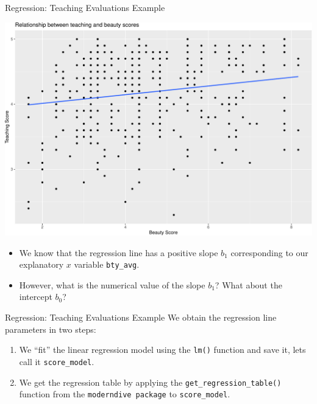 \documentclass[
  ignorenonframetext,
]{beamer}
\begin{document}
\begin{frame}[fragile]{Regression: Teaching Evaluations Example}
\protect\hypertarget{regression-teaching-evaluations-example}{}
\tiny

\begin{center}\includegraphics[width=0.5\linewidth,height=0.5\textheight]{Week4_files/figure-beamer/unnamed-chunk-19-1} \end{center}
\normalsize

\begin{itemize}
\item
  We know that the regression line has a positive slope \(b_1\)
  corresponding to our explanatory \(x\) variable \texttt{bty\_avg}.
\item
  However, what is the numerical value of the slope \(b_1\)? What about
  the intercept \(b_0\)?
\end{itemize}
\end{frame}

\begin{frame}[fragile]{Regression: Teaching Evaluations Example}
\protect\hypertarget{regression-teaching-evaluations-example-1}{}
We obtain the regression line parameters in two steps:

\begin{enumerate}
\item
  We ``fit'' the linear regression model using the \texttt{lm()}
  function and save it, lets call it \texttt{score\_model}.
\item
  We get the regression table by applying the
  \texttt{get\_regression\_table()} function from the
  \texttt{moderndive\ package} to \texttt{score\_model}.
\end{enumerate}
\end{frame}
\end{document}
